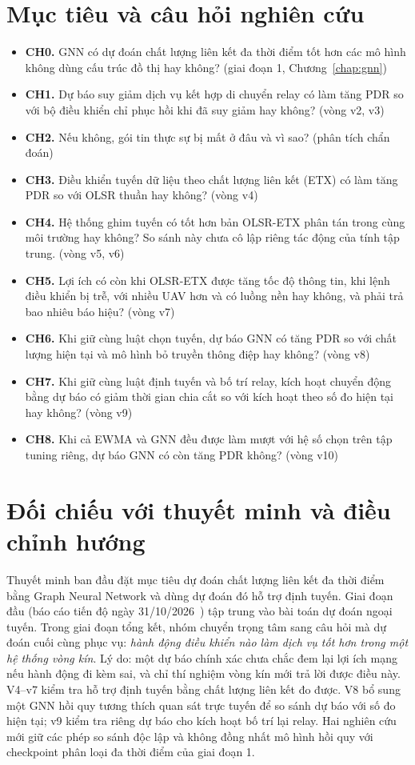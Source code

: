 \documentclass[12pt,a4paper]{report}
\begin{document}
\section{Mục tiêu và câu hỏi nghiên cứu}
\begin{itemize}
  \item \textbf{CH0.} GNN có dự đoán chất lượng liên kết đa thời điểm tốt hơn các mô hình không dùng cấu trúc đồ thị hay không? (giai đoạn 1, Chương~\ref{chap:gnn})
  \item \textbf{CH1.} Dự báo suy giảm dịch vụ kết hợp di chuyển relay có làm tăng PDR so với bộ điều khiển chỉ phục hồi khi đã suy giảm hay không? (vòng v2, v3)
  \item \textbf{CH2.} Nếu không, gói tin thực sự bị mất ở đâu và vì sao? (phân tích chẩn đoán)
  \item \textbf{CH3.} Điều khiển tuyến dữ liệu theo chất lượng liên kết (ETX) có làm tăng PDR so với OLSR thuần hay không? (vòng v4)
  \item \textbf{CH4.} Hệ thống ghim tuyến có tốt hơn bản OLSR-ETX phân tán trong cùng môi trường hay không? So sánh này chưa cô lập riêng tác động của tính tập trung. (vòng v5, v6)
  \item \textbf{CH5.} Lợi ích có còn khi OLSR-ETX được tăng tốc độ thông tin, khi lệnh điều khiển bị trễ, với nhiều UAV hơn và có luồng nền hay không, và phải trả bao nhiêu báo hiệu? (vòng v7)
  \item \textbf{CH6.} Khi giữ cùng luật chọn tuyến, dự báo GNN có tăng PDR so với chất lượng hiện tại và mô hình bỏ truyền thông điệp hay không? (vòng v8)
  \item \textbf{CH7.} Khi giữ cùng luật định tuyến và bố trí relay, kích hoạt chuyển động bằng dự báo có giảm thời gian chia cắt so với kích hoạt theo số đo hiện tại hay không? (vòng v9)
  \item \textbf{CH8.} Khi cả EWMA và GNN đều được làm mượt với hệ số chọn trên tập tuning riêng, dự báo GNN có còn tăng PDR không? (vòng v10)
\end{itemize}

\section{Đối chiếu với thuyết minh và điều chỉnh hướng}
Thuyết minh ban đầu đặt mục tiêu dự đoán chất lượng liên kết đa thời điểm bằng Graph Neural Network và dùng dự đoán đó hỗ trợ định tuyến. Giai đoạn đầu (báo cáo tiến độ ngày 31/10/2026~\cite{tiendo}) tập trung vào bài toán dự đoán ngoại tuyến. Trong giai đoạn tổng kết, nhóm chuyển trọng tâm sang câu hỏi mà dự đoán cuối cùng phục vụ: \emph{hành động điều khiển nào làm dịch vụ tốt hơn trong một hệ thống vòng kín}. Lý do: một dự báo chính xác chưa chắc đem lại lợi ích mạng nếu hành động đi kèm sai, và chỉ thí nghiệm vòng kín mới trả lời được điều này. V4--v7 kiểm tra hỗ trợ định tuyến bằng chất lượng liên kết đo được. V8 bổ sung một GNN hồi quy tương thích quan sát trực tuyến để so sánh dự báo với số đo hiện tại; v9 kiểm tra riêng dự báo cho kích hoạt bố trí lại relay. Hai nghiên cứu mới giữ các phép so sánh độc lập và không đồng nhất mô hình hồi quy với checkpoint phân loại đa thời điểm của giai đoạn 1.
\end{document}
